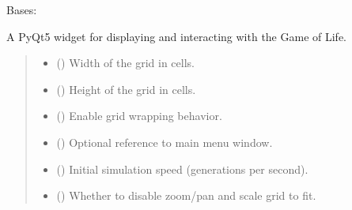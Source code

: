 \documentclass[letterpaper,10pt,oneside,english]{sphinxhowto}
\begin{document}
\begin{fulllineitems}
\label{\detokenize{gui:gui.game_gui.GameOfLifeGUI}}
\pysigstartsignatures
\pysiglinewithargsret
{}
{\sphinxparamcomma {}\sphinxparamcomma {}\sphinxparamcomma {}\sphinxparamcomma {}\sphinxparamcomma {}}
{}
\pysigstopsignatures
\sphinxAtStartPar
Bases: 

\sphinxAtStartPar
A PyQt5 widget for displaying and interacting with the Game of Life.
\begin{quote}\begin{description}
\begin{itemize}
\item {} 
\sphinxAtStartPar
{} () \textendash{} Width of the grid in cells.

\item {} 
\sphinxAtStartPar
{} () \textendash{} Height of the grid in cells.

\item {} 
\sphinxAtStartPar
{} () \textendash{} Enable grid wrapping behavior.

\item {} 
\sphinxAtStartPar
{} () \textendash{} Optional reference to main menu window.

\item {} 
\sphinxAtStartPar
{} () \textendash{} Initial simulation speed (generations per second).

\item {} 
\sphinxAtStartPar
{} () \textendash{} Whether to disable zoom/pan and scale grid to fit.


\end{itemize}
\end{description}
\end{quote}
\end{fulllineitems}
\end{document}

